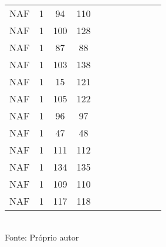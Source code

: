 \begin{table}[H]
{\begin{tabular}{ccccccccccc}
NAF & 1 & 94 & 110 &  &  &  &  &  &  &  \\
NAF & 1 & 100 & 128 &  &  &  &  &  &  &  \\
NAF & 1 & 87 & 88 &  &  &  &  &  &  &  \\
NAF & 1 & 103 & 138 &  &  &  &  &  &  &  \\
NAF & 1 & 15 & 121 &  &  &  &  &  &  &  \\
NAF & 1 & 105 & 122 &  &  &  &  &  &  &  \\
NAF & 1 & 96 & 97 &  &  &  &  &  &  &  \\
NAF & 1 & 47 & 48 &  &  &  &  &  &  &  \\
NAF & 1 & 111 & 112 &  &  &  &  &  &  &  \\
NAF & 1 & 134 & 135 &  &  &  &  &  &  &  \\
NAF & 1 & 109 & 110 &  &  &  &  &  &  &  \\
NAF & 1 & 117 & 118 &  &  &  &  &  &  &  \\
\bottomrule
\end{tabular}}
\\Fonte: Próprio autor
\end{table}


